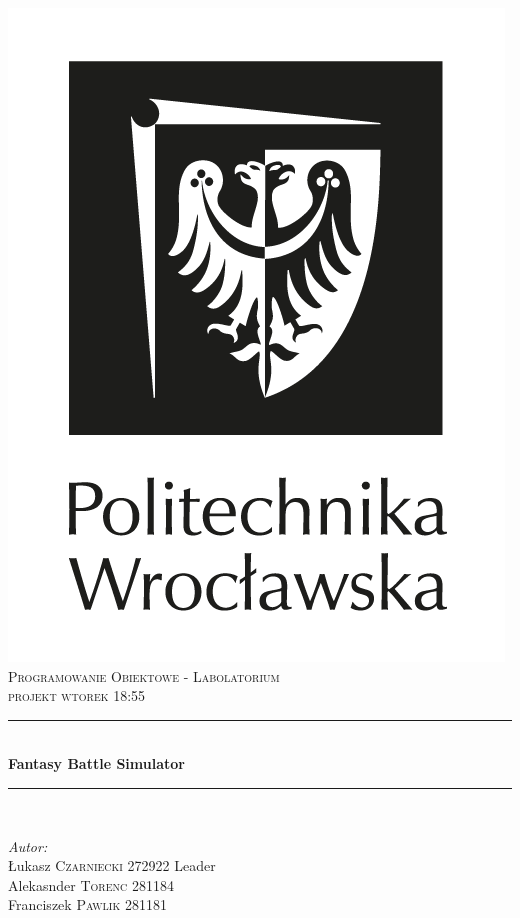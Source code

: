 \documentclass[11pt]{article}
\begin{document}
\begin{titlepage}
\newcommand{\HRule}{\rule{\linewidth}{0.5mm}} %
\center %
\includegraphics[scale = 0.21]{pwr-logo.png}\\[2cm]
\textsc{\Large Programowanie Obiektowe - Labolatorium}\\[0.5cm] 
\textsc{\large projekt wtorek 18:55}\\[0.5cm]
\HRule \\[0.4cm]
{ \huge \bfseries Fantasy Battle Simulator
}\\[0.4cm] 
\HRule \\[0.8cm]
\begin{minipage}{0.5\textwidth}
\begin{flushleft} \large
\emph{Autor:}\\
Łukasz \textsc{Czarniecki} 272922  Leader\\
Alekasnder \textsc{Torenc} 281184 \\
Franciszek \textsc{Pawlik} 281181 \\


\end{flushleft}
\end{minipage}
\end{titlepage}
\end{document}
